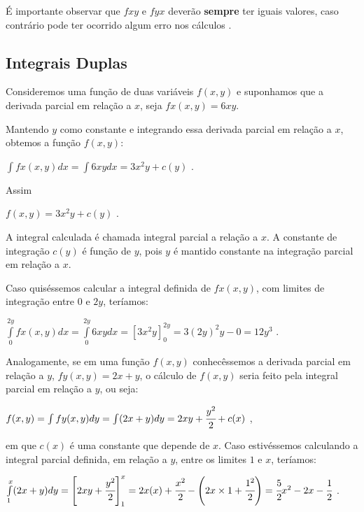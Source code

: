 		É importante observar que $fxy$ e $fyx$ deverão \textbf{sempre} ter iguais valores, caso contrário pode ter ocorrido algum erro nos cálculos \cite{lucchesi}.

	\subsection{Integrais Duplas \cite{morettin}}

		Consideremos uma função de duas variáveis $f(x, y)$ e suponhamos que a derivada parcial em relação a $x$, seja $fx(x, y) = 6xy$.

		Mantendo $y$ como constante e integrando essa derivada parcial em relação a $x$, obtemos a função $f(x, y)$:

		\medskip

		$\int fx(x, y)dx = \int 6xy dx = 3x^{2}y + c(y)$ .

		\medskip

		Assim

		\medskip

		$f(x, y) = 3x^{2}y + c(y)$ .

		\medskip

		A integral calculada é chamada integral parcial a relação a $x$. A constante de integração $c(y)$ é função de $y$, pois $y$ é mantido constante na integração parcial em relação a $x$.

		Caso quiséssemos calcular a integral definida de $fx(x, y)$, com limites de integração entre $0$ e $2y$, teríamos:

		\medskip

		$\int \limits^{2y}_{0} fx(x, y) dx = \int \limits^{2y}_{0} 6xy dx = \left[3x^{2}y\right]^{2y}_{0} = 3(2y)^{2}y - 0 = 12y^{3}$ .

		\medskip

		Analogamente, se em uma função $f(x, y)$ conhecêssemos a derivada parcial em relação a $y$, $fy(x, y) = 2x + y$, o cálculo de $f(x, y)$ seria feito pela integral parcial em relação a $y$, ou seja:

		\medskip

		$f(x, y) = \int fy(x, y) dy = \int (2x + y) dy = 2xy + \cfrac{y^{2}}{2} + c(x)$ ,

		\medskip

		em que $c(x)$ é uma constante que depende de $x$. Caso estivéssemos calculando a integral parcial definida, em relação a $y$, entre os limites $1$ e $x$, teríamos:

		\medskip

		$\int \limits^{x}_{1} (2x + y) dy = \left[ 2xy + \cfrac{y^{2}}{2}\right]^{x}_{1} = 2x(x) + \cfrac{x^{2}}{2} - \left( 2x \times 1 + \cfrac{1^{2}}{2} \right) = \cfrac{5}{2} x^{2} - 2x - \cfrac{1}{2}$ .
		
